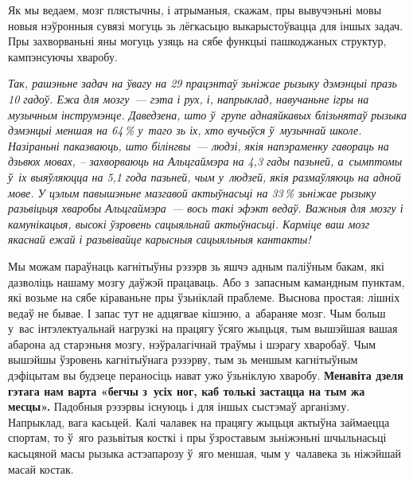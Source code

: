 
Як мы ведаем, мозг плястычны, і атрыманыя, скажам, пры вывучэньні мовы новыя нэўронныя сувязі могуць зь лёгкасьцю выкарыстоўвацца для іншых задач. Пры захворваньні яны могуць узяць на сябе функцыі пашкоджаных структур, кампэнсуючы хваробу.


\emph{Так, рашэньне задач на ўвагу на 29 працэнтаў зьніжае рызыку дэмэнцыі празь 10 гадоў. Ежа для мозгу~--- гэта і рух, і, напрыклад, навучаньне ігры на музычным інструмэнце. Даведзена, што ў~групе аднаяйкавых блізьнятаў рызыка дэмэнцыі меншая на 64\,\% у~таго зь іх, хто вучыўся ў~музычнай школе. Назіраньні паказваюць, што білінгвы~--- людзі, якія напэраменку гавораць на дзьвюх мовах, -- захворваюць на Альцгаймэра на 4,3 гады пазьней, а~сымптомы ў~іх выяўляюцца на 5,1 года пазьней, чым у~людзей, якія размаўляюць на адной мове. У цэлым павышэньне мазгавой актыўнасьці на 33\,\% зьніжае рызыку разьвіцьця хваробы Альцгаймэра~--- вось такі эфэкт ведаў. Важныя для мозгу і камунікацыя, высокі ўзровень сацыяльнай актыўнасьці. Карміце ваш мозг якаснай ежай і разьвівайце карысныя сацыяльныя кантакты!}

Мы можам параўнаць кагнітыўны рэзэрв зь яшчэ адным паліўным бакам, які дазволіць нашаму мозгу даўжэй працаваць. Або з~запасным камандным пунктам, які возьме на сябе кіраваньне пры ўзьніклай праблеме. Выснова простая: лішніх ведаў не бывае. І запас тут не адцягвае кішэню, а~абараняе мозг. Чым больш у~вас інтэлектуальнай нагрузкі на працягу ўсяго жыцьця, тым вышэйшая вашая абарона ад старэньня мозгу, нэўралагічнай траўмы і шэрагу хваробаў. Чым вышэйшы ўзровень кагнітыўнага рэзэрву, тым зь меншым кагнітыўным дэфіцытам вы будзеце пераносіць нават ужо ўзьніклую хваробу. \textbf{Менавіта дзеля гэтага нам варта «бегчы з~усіх ног, каб толькі застацца на тым жа месцы».} Падобныя рэзэрвы існуюць і для іншых сыстэмаў арганізму. Напрыклад, вага касьцей. Калі чалавек на працягу жыцьця актыўна займаецца спортам, то ў~яго разьвітыя косткі і пры ўзроставым зьніжэньні шчыльнасьці касьцяной масы рызыка астэапарозу ў~яго меншая, чым у~чалавека зь ніжэйшай масай костак.

